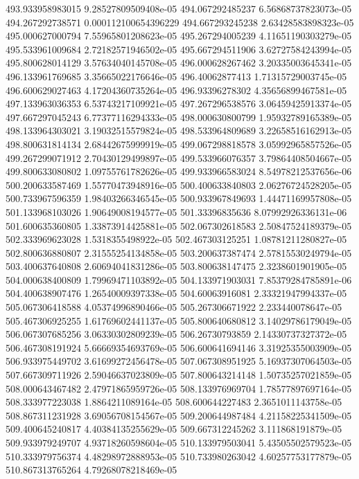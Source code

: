 {493.933958983015 9.28527809509408e-05
494.067292485237 6.56868737823073e-05
494.267292738571 0.000112100654396229
494.667293245238 2.63428583898323e-05
495.000627000794 7.55965801208623e-05
495.267294005239 4.11651190303279e-05
495.533961009684 2.72182571946502e-05
495.667294511906 3.62727584243994e-05
495.800628014129 3.57634040145708e-05
496.000628267462 3.20335003645341e-05
496.133961769685 3.35665022176646e-05
496.40062877413 1.71315729003745e-05
496.600629027463 4.17204360735264e-05
496.93396278302 4.35656899467581e-05
497.133963036353 6.53743217109921e-05
497.267296538576 3.06459425913374e-05
497.667297045243 6.77377116294333e-05
498.000630800799 1.95932789165389e-05
498.133964303021 3.19032515579824e-05
498.533964809689 3.22658516162913e-05
498.800631814134 2.68442675999919e-05
499.067298818578 3.05992965857526e-05
499.267299071912 2.70430129499897e-05
499.533966076357 3.79864408504667e-05
499.800633080802 1.09755761782626e-05
499.933966583024 8.54978212537656e-06
500.200633587469 1.55770473948916e-05
500.400633840803 2.06276724528205e-05
500.733967596359 1.98403266346545e-05
500.933967849693 1.44471169957808e-05
501.133968103026 1.90649008194577e-05
501.33396835636 8.07992926336131e-06
501.600635360805 1.33873914425881e-05
502.067302618583 2.50847524189379e-05
502.333969623028 1.5318355498922e-05
502.467303125251 1.08781211280827e-05
502.800636880807 2.31555254134858e-05
503.200637387474 2.57815530249794e-05
503.400637640808 2.60694041831286e-05
503.800638147475 2.3238601901905e-05
504.000638400809 1.79969471103892e-05
504.133971903031 7.85379284785891e-06
504.400638907476 1.26540009397338e-05
504.60063916081 2.33321947994337e-05
505.067306418588 4.05374996890466e-05
505.267306671922 2.233440078647e-05
505.467306925255 1.61769602441137e-05
505.800640680812 3.14029786179049e-05
506.067307685256 3.06330302809239e-05
506.26730793859 2.14330737327372e-05
506.467308191924 5.66669354693769e-05
506.600641694146 3.31925355003909e-05
506.933975449702 3.61699272456478e-05
507.067308951925 5.16937307064503e-05
507.667309711926 2.59046637023809e-05
507.800643214148 1.50735257021859e-05
508.000643467482 2.47971865959726e-05
508.133976969704 1.78577897697164e-05
508.333977223038 1.8864211089164e-05
508.600644227483 2.3651011143758e-05
508.867311231928 3.69056708154567e-05
509.200644987484 4.21158225341509e-05
509.400645240817 4.40384135255629e-05
509.667312245262 3.111868191879e-05
509.933979249707 4.93718260598604e-05
510.133979503041 5.43505502579523e-05
510.333979756374 4.48298972888953e-05
510.733980263042 4.60257753177879e-05
510.867313765264 4.79268078218469e-05
}
